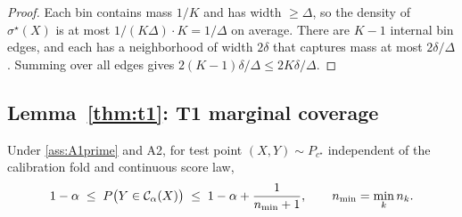 \begin{proof}
Each bin contains mass $1/K$ and has width $\geq \Delta$, so the density of $\sigma^\star(X)$ is at most $1/(K\Delta) \cdot K = 1/\Delta$ on average. There are $K-1$ internal bin edges, and each has a neighborhood of width $2\delta$ that captures mass at most $2\delta/\Delta$. Summing over all edges gives $2(K-1)\delta/\Delta \leq 2K\delta/\Delta$.
\end{proof}


\subsection{Lemma~\ref{thm:t1}: T1 marginal coverage}
\label{app:proofs:t1}

\begin{lemma}
\label{thm:t1}
Under \ref{ass:A1prime} and A2, for test point $(X, Y) \sim P_{c^\star}$ independent of the calibration fold and continuous score law,
\[
1 - \alpha \;\leq\; P\bigl(Y \in \mathcal{C}_\alpha(X)\bigr) \;\leq\; 1 - \alpha + \frac{1}{n_{\min} + 1},
\qquad n_{\min} = \min_k n_k.
\]
\end{lemma}

